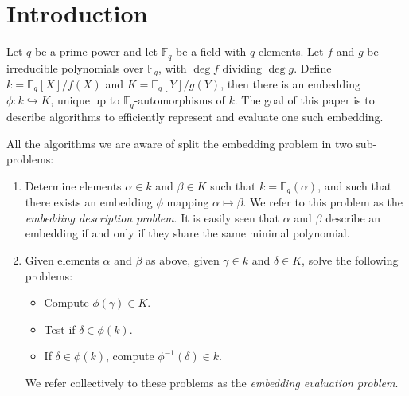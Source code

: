 \documentclass[12pt]{article}
\theoremstyle{plain}
\theoremstyle{definition}
\def\F{\ensuremath{\mathbb{F}}}
\newcounter{algorithm}
\begin{document}
\section{Introduction}
\label{sec:introduction}

Let $q$ be a prime power and let $\F_q$ be a field with $q$
elements. Let $f$ and $g$ be irreducible polynomials over $\F_q$, with
$\deg f$ dividing $\deg g$. Define $k=\F_q[X]/f(X)$ and
$K=\F_q[Y]/g(Y)$, then there is an embedding $\phi:k\hookrightarrow
K$, unique up to $\F_q$-automorphisms of $k$. The goal of this paper
is to describe algorithms to efficiently represent and evaluate one
such embedding.

All the algorithms we are aware of split the embedding problem in two
sub-problems:
\begin{enumerate}
\item Determine elements $\alpha\in k$ and $\beta\in K$ such that
  $k=\F_q(\alpha)$, and such that there exists an
  embedding $\phi$ mapping $\alpha\mapsto\beta$. We refer to this
  problem as the \emph{embedding description problem}.
  It is easily seen that $\alpha$ and $\beta$ describe an embedding
  if and only if they share the same minimal polynomial.
\item Given elements $\alpha$ and $\beta$ as above, given $\gamma\in
  k$ and $\delta\in K$, solve the following problems:
  \begin{itemize}
  \item Compute $\phi(\gamma)\in K$.
  \item Test if $\delta\in\phi(k)$.
  \item If $\delta\in\phi(k)$, compute $\phi^{-1}(\delta)\in k$.
  \end{itemize}
  We refer collectively to these problems as the \emph{embedding
    evaluation problem}.
\end{enumerate}
\end{document}

